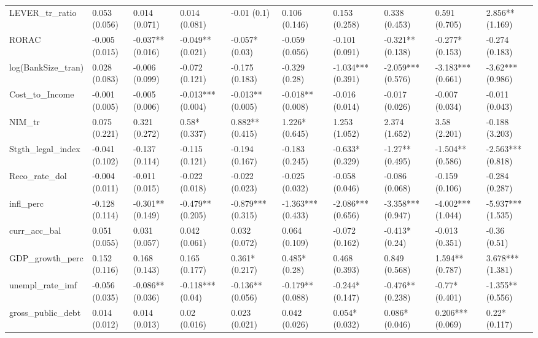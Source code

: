 \begin{table}[H]
\begin{adjustbox}{totalheight=3in, width=\columnwidth }
\begin{subtable}[c]{1.1\textwidth}
{\begin{tabular}{llllllllll}
  LEVER\_tr\_ratio & 0.053 (0.056) & 0.014 (0.071) & 0.014 (0.081) & -0.01 (0.1) & 0.106 (0.146) & 0.153 (0.258) & 0.338 (0.453) & 0.591 (0.705) & 2.856** (1.169) \\ 
  RORAC & -0.005 (0.015) & -0.037** (0.016) & -0.049** (0.021) & -0.057* (0.03) & -0.059 (0.056) & -0.101 (0.091) & -0.321** (0.138) & -0.277* (0.153) & -0.274 (0.183) \\ 
  log(BankSize\_tran) & 0.028 (0.083) & -0.006 (0.099) & -0.072 (0.121) & -0.175 (0.183) & -0.329 (0.28) & -1.034*** (0.391) & -2.059*** (0.576) & -3.183*** (0.661) & -3.62*** (0.986) \\ 
  Cost\_to\_Income & -0.001 (0.005) & -0.005 (0.006) & -0.013*** (0.004) & -0.013** (0.005) & -0.018** (0.008) & -0.016 (0.014) & -0.017 (0.026) & -0.007 (0.034) & -0.011 (0.043) \\ 
  NIM\_tr & 0.075 (0.221) & 0.321 (0.272) & 0.58* (0.337) & 0.882** (0.415) & 1.226* (0.645) & 1.253 (1.052) & 2.374 (1.652) & 3.58 (2.201) & -0.188 (3.203) \\ 
  Stgth\_legal\_index & -0.041 (0.102) & -0.137 (0.114) & -0.115 (0.121) & -0.194 (0.167) & -0.183 (0.245) & -0.633* (0.329) & -1.27** (0.495) & -1.504** (0.586) & -2.563*** (0.818) \\ 
  Reco\_rate\_dol & -0.004 (0.011) & -0.011 (0.015) & -0.022 (0.018) & -0.022 (0.023) & -0.025 (0.032) & -0.058 (0.046) & -0.086 (0.068) & -0.159 (0.106) & -0.284 (0.287) \\ 
  infl\_perc & -0.128 (0.114) & -0.301** (0.149) & -0.479** (0.205) & -0.879*** (0.315) & -1.363*** (0.433) & -2.086*** (0.656) & -3.358*** (0.947) & -4.002*** (1.044) & -5.937*** (1.535) \\ 
  curr\_acc\_bal & 0.051 (0.055) & 0.031 (0.057) & 0.042 (0.061) & 0.032 (0.072) & 0.064 (0.109) & -0.072 (0.162) & -0.413* (0.24) & -0.013 (0.351) & -0.36 (0.51) \\ 
  GDP\_growth\_perc & 0.152 (0.116) & 0.168 (0.143) & 0.165 (0.177) & 0.361* (0.217) & 0.485* (0.28) & 0.468 (0.393) & 0.849 (0.568) & 1.594** (0.787) & 3.678*** (1.381) \\ 
  unempl\_rate\_imf & -0.056 (0.035) & -0.086** (0.036) & -0.118*** (0.04) & -0.136** (0.056) & -0.179** (0.088) & -0.244* (0.147) & -0.476** (0.238) & -0.77* (0.401) & -1.355** (0.556) \\ 
  gross\_public\_debt & 0.014 (0.012) & 0.014 (0.013) & 0.02 (0.016) & 0.023 (0.021) & 0.042 (0.026) & 0.054* (0.032) & 0.086* (0.046) & 0.206*** (0.069) & 0.22* (0.117) \\ 

\end{tabular}}
\end{subtable}
\end{adjustbox}
\end{table}
